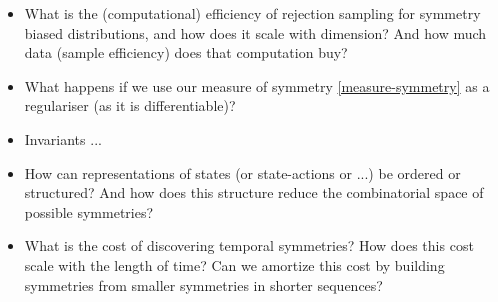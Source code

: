 \begin{itemize}
	\tightlist
	\item What is the (computational) efficiency of rejection sampling for symmetry biased distributions, and how does it scale with dimension? And how much data (sample efficiency) does that computation buy?
	\item What happens if we use our measure of symmetry \ref{measure-symmetry} as a regulariser (as it is differentiable)?
	\item Invariants ...
	\item How can representations of states (or state-actions or ...) be ordered or structured? And how does this structure reduce the combinatorial space of possible symmetries?
	\item What is the cost of discovering temporal symmetries? How does this cost scale with the length of time? Can we amortize this cost by building symmetries from smaller symmetries in shorter sequences?
\end{itemize}

